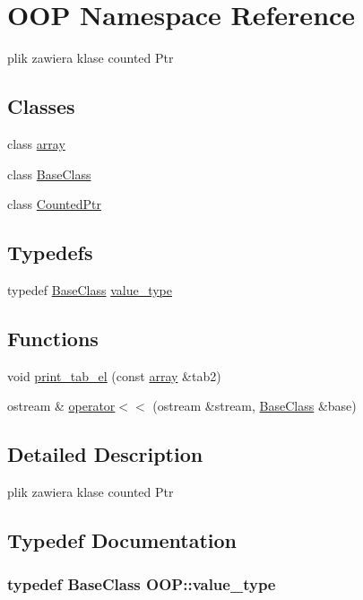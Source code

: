 \hypertarget{namespaceOOP}{\section{\-O\-O\-P \-Namespace \-Reference}
\label{namespaceOOP}
}


plik zawiera klase counted \-Ptr  


\subsection*{\-Classes}
\begin{DoxyCompactItemize}
\item 
class \hyperlink{classOOP_1_1array}{array}
\item 
class \hyperlink{classOOP_1_1BaseClass}{\-Base\-Class}
\item 
class \hyperlink{classOOP_1_1CountedPtr}{\-Counted\-Ptr}
\end{DoxyCompactItemize}
\subsection*{\-Typedefs}
\begin{DoxyCompactItemize}
\item 
typedef \hyperlink{classOOP_1_1BaseClass}{\-Base\-Class} \hyperlink{namespaceOOP_a98bf9fa44d8f36499284c9d57c1958aa}{value\-\_\-type}
\end{DoxyCompactItemize}
\subsection*{\-Functions}
\begin{DoxyCompactItemize}
\item 
void \hyperlink{namespaceOOP_a32e75bb4328dbb5e86e98a8af0a5cf61}{print\-\_\-tab\-\_\-el} (const \hyperlink{classOOP_1_1array}{array} \&tab2)
\item 
ostream \& \hyperlink{namespaceOOP_a3f50dd68985954d3519768fe0da14797}{operator$<$$<$} (ostream \&stream, \hyperlink{classOOP_1_1BaseClass}{\-Base\-Class} \&base)
\end{DoxyCompactItemize}


\subsection{\-Detailed \-Description}
plik zawiera klase counted \-Ptr 

\subsection{\-Typedef \-Documentation}
\hypertarget{namespaceOOP_a98bf9fa44d8f36499284c9d57c1958aa}{
\subsubsection[{value\-\_\-type}]{\setlength{\rightskip}{0pt plus 5cm}typedef {\bf \-Base\-Class} {\bf \-O\-O\-P\-::value\-\_\-type}}}\label{namespaceOOP_a98bf9fa44d8f36499284c9d57c1958aa}


